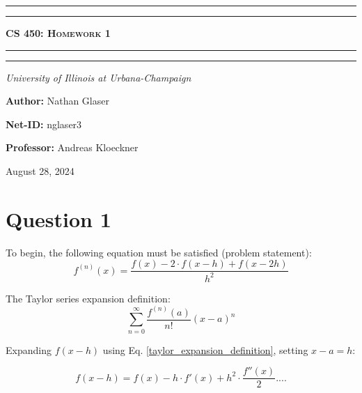 \documentclass{article}
\begin{document}
\begin{titlepage}

\centering
\scshape
\vspace{\baselineskip}

%
\rule{\textwidth}{1.6pt}\vspace*{-\baselineskip}\vspace*{2pt}
\rule{\textwidth}{0.4pt}

{\Huge \textbf{\textsc{CS 450: Homework 1 \\
\vspace{15pt}}}}

\rule{\textwidth}{0.4pt}\vspace*{-\baselineskip}\vspace{3.2pt}
\rule{\textwidth}{1.6pt}\vspace{6pt}
\centerline{\textit{University of Illinois at Urbana-Champaign}} 
\vspace{1.5\baselineskip}


\large \centerline{\textbf{Author:} Nathan Glaser}
\large \centerline{\textbf{Net-ID:} nglaser3}
\quad

\large \centerline{\textbf{Professor:} Andreas Kloeckner}
\quad

\vfill
\large \centerline{August 28, 2024}
%
\end{titlepage}

\tableofcontents
\newpage
{}

\section{Question 1}
To begin, the following equation must be satisfied (problem statement):
\begin{equation}
    f^{(n)}(x) = \frac{f(x) -2 \cdot f(x-h) + f(x-2h)}{h^2}
    \label{abc}
\end{equation}

The Taylor series expansion definition:
\begin{equation}
    \label{taylor_expansion_definition}
    \sum_{n=0}^\infty \frac{f^{(n)}(a)}{n!}(x-a)^n
\end{equation}

Expanding $f(x-h)$ using Eq. \ref{taylor_expansion_definition}, setting $x-a = h$:

\begin{equation}
    \label{fx_h}
    f(x-h) = f(x) - h\cdot f'(x) + h^2 \cdot \frac{f''(x)}{2}  ....
\end{equation}
\end{document}
